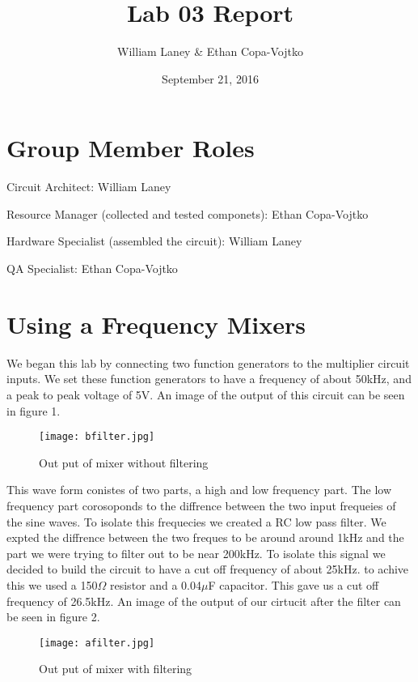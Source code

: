 \documentclass[prl,12pt,notitlepage,aps,onecolumn,superscriptaddress]{revtex4-1}
\newcommand{\ohm}{$\Omega$ }
\begin{document}
\title{Lab 03 Report}
\author{William Laney \& Ethan Copa-Vojtko}
\date{September 21, 2016}
\maketitle

\section{Group Member Roles}
Circuit Architect: William Laney

Resource Manager (collected and tested componets): Ethan Copa-Vojtko

Hardware Specialist (assembled the circuit): William Laney

QA Specialist: Ethan Copa-Vojtko

\section{Using a Frequency Mixers}
We began this lab by connecting two function generators to the multiplier circuit inputs. We set these function generators to have a frequency of about 50kHz, and a peak to peak voltage of 5V. An image of the output of this circuit can be seen in figure 1. 

\begin{figure}[h]
\begin{center}
\texttt{[image: bfilter.jpg]}
\end{center}
\caption{\label{fig:pic} Out put of mixer without filtering}
\end{figure}

This wave form conistes of two parts, a high and low frequency part. The low frequency part corosoponds to the diffrence between the two input frequeies of the sine waves. To isolate this frequecies we created a RC low pass filter. We expted the diffrence between the two freques to be around around 1kHz and the part we were trying to filter out to be near 200kHz. To isolate this signal we decided to build the circuit to have a cut off frequency of about 25kHz. to achive this we used a  150\ohm resistor and a 0.04$\mu$F capacitor. This gave us a cut off frequency of 26.5kHz. An image of the output of our cirtucit after the filter can be seen in figure 2.

\begin{figure}[h]
\begin{center}
\texttt{[image: afilter.jpg]}
\end{center}
\caption{\label{fig:pic} Out put of mixer with filtering}
\end{figure}
\end{document}
